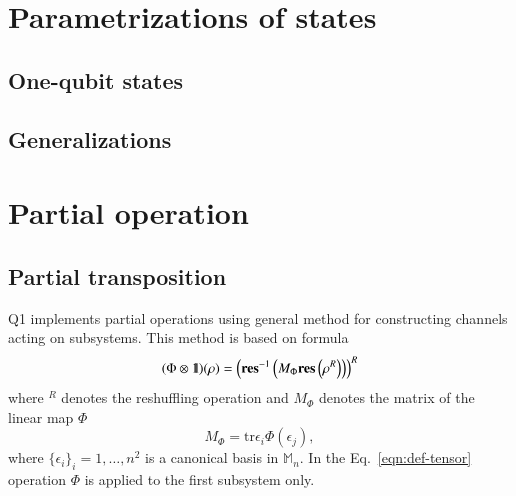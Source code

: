 \documentclass[final,5p,times,twocolumn]{elsarticle}
\newcommand{\res}{\mathbf{res}}
\newcommand{\1}{{\rm 1\hspace{-0.9mm}l}}
\newcommand{\Id}{\1}
\newcommand{\tr}{\mathrm{tr}}
\newcommand{\M}{\ensuremath{\mathbb{M}}}
\begin{document}
\section{Parametrizations of states}\label{sec:states}

\subsection{One-qubit states}

\subsection{Generalizations}
\cite{tilma02generalized}

\section{Partial operation}

\subsection{Partial transposition}
Q1 implements partial operations using general method for constructing channels
acting on subsystems. This method is based on formula
\begin{equation}\label{eqn:def-tensor}
(\Phi\otimes\Id)(\rho) = 
\left(\res^{-1}\left(M_\Phi\res\left(\rho^R\right)\right)\right)^R
\end{equation}
where ${}^R$ denotes the reshuffling operation and $M_\Phi$ denotes the matrix
of the linear map $\Phi$
\begin{equation}
M_\Phi = \tr \epsilon_i \Phi(\epsilon_j),
\end{equation}
where $\{\epsilon_i\}_i=1,\ldots,n^2$ is a canonical basis in $\M_n$. In the 
Eq.~\ref{eqn:def-tensor} operation $\Phi$ is applied to the first subsystem 
only.
\end{document}
